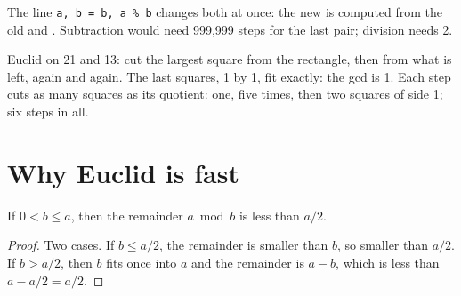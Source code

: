 \label{lst:g9:algorithms-on-numbers:gcd}

\label{out:g9:algorithms-on-numbers:gcd}

The line \texttt{a, b = b, a \% b} changes both  at once: the new
 is computed from the old  and . Subtraction would need
999,999 steps for the last pair; division needs 2.

\begin{omfigure}

{\small Euclid on 21 and 13: cut the largest square from the rectangle, then from
what is left, again and again. The last squares, 1 by 1, fit exactly: the gcd is
1. Each step cuts as many squares as its quotient: one, five times, then two
squares of side 1; six steps in all.}
\end{omfigure}

\section{Why Euclid is fast}

\begin{proposition}\label{prop:g9:algorithms-on-numbers:euclid-halves}
If $0 < b \le a$, then the remainder $a \bmod b$ is less than $a / 2$.
\end{proposition}

\begin{proof}
Two cases. If $b \le a / 2$, the remainder is smaller than $b$, so smaller than
$a / 2$. If $b > a / 2$, then $b$ fits once into $a$ and the remainder is
$a - b$, which is less than $a - a / 2 = a / 2$.
\end{proof}

